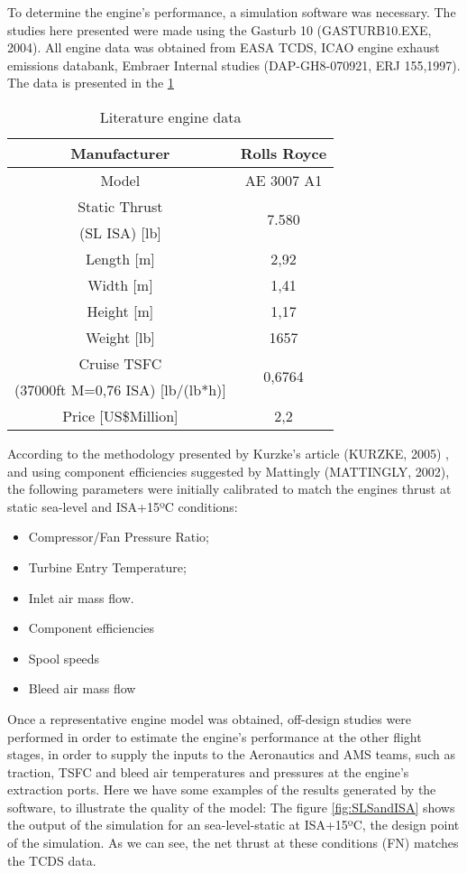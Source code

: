 To determine the engine's performance, a simulation software was necessary. The studies here presented were made using the Gasturb 10 (GASTURB10.EXE, 2004).
All engine data was obtained from EASA TCDS, ICAO engine exhaust emissions databank, Embraer Internal studies (DAP-GH8-070921, ERJ 155,1997).
The data is presented in the \ref{tab:enginedata}

\begin{table}[htbp]
  \centering
  \caption{Literature engine data}
    \begin{tabular}{cc}
    \toprule
    Manufacturer & Rolls Royce \\
    \midrule
    Model & AE 3007 A1 \\
    Static Thrust & \multirow{2}[2]{*}{7.580} \\
    (SL ISA) [lb] &  \\
    Length [m] & 2,92 \\
    Width [m] & 1,41 \\
    Height [m] & 1,17 \\
    Weight [lb] & 1657 \\
    Cruise TSFC & \multirow{2}[2]{*}{0,6764} \\
    (37000ft M=0,76 ISA)  [lb/(lb*h)] &  \\
    Price [US\$Million] & 2,2 \\
    \bottomrule
    \end{tabular}%
  \label{tab:enginedata}%
\end{table}%

According to the methodology presented by Kurzke's article (KURZKE, 2005) , and using component efficiencies suggested by Mattingly (MATTINGLY, 2002), the following parameters were initially calibrated to match the engines thrust at static sea-level and ISA+15ºC conditions:

\begin{itemize}
\item Compressor/Fan Pressure Ratio;
\item Turbine Entry Temperature;
\item Inlet air mass flow.
\item Component efficiencies
\item Spool speeds
\item Bleed air mass flow
\end{itemize}
Once a representative engine model was obtained, off-design studies were performed in order to estimate the engine's performance at the other flight stages, in order to supply the inputs to the Aeronautics and AMS teams, such as traction, TSFC and bleed air temperatures and pressures at the engine's extraction ports.
Here we have some examples of the results generated by the software, to illustrate the quality of the model:
The figure \ref{fig:SLSandISA} shows the output of the simulation for an sea-level-static at ISA+15ºC, the design point of the simulation. As we can see, the net thrust at these conditions (FN) matches the TCDS data.

